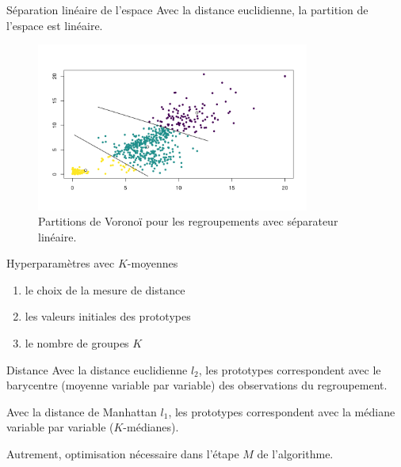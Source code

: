\documentclass[
  ignorenonframetext,
]{beamer}
\providecommand{\tightlist}{%
  \setlength{\itemsep}{0pt}\setlength{\parskip}{0pt}}\usepackage{longtable,booktabs,array}
\begin{document}
\begin{frame}{Séparation linéaire de l'espace}
\protect\hypertarget{suxe9paration-linuxe9aire-de-lespace}{}
Avec la distance euclidienne, la partition de l'espace est linéaire.

\begin{figure}

{\centering \includegraphics[width=0.8\textwidth,height=\textheight]{figures/fig-voronoikmoy.png}

}

\caption{\label{fig-voronoy}Partitions de Voronoï pour les regroupements
avec séparateur linéaire.}

\end{figure}
\end{frame}

\begin{frame}{Hyperparamètres avec \(K\)-moyennes}
\protect\hypertarget{hyperparamuxe8tres-avec-k-moyennes}{}
\begin{enumerate}
\tightlist
\item
  le choix de la mesure de distance
\item
  les valeurs initiales des prototypes
\item
  le nombre de groupes \(K\)
\end{enumerate}
\end{frame}

\begin{frame}{Distance}
\protect\hypertarget{distance}{}
Avec la distance euclidienne \(l_2\), les prototypes correspondent avec
le barycentre (moyenne variable par variable) des observations du
regroupement.

Avec la distance de Manhattan \(l_1\), les prototypes correspondent avec
la médiane variable par variable (\(K\)-médianes).

Autrement, optimisation nécessaire dans l'étape \(M\) de l'algorithme.
\end{frame}
\end{document}
